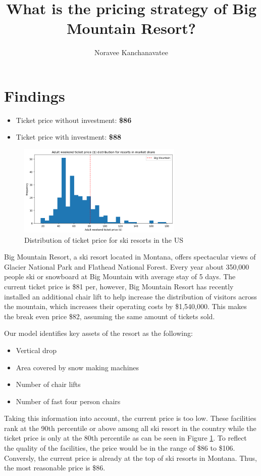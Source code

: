 \documentclass[14pt,a4paper]{extarticle}
\title{What is the pricing strategy of Big Mountain Resort?}
\author{Noravee Kanchanavatee}
\begin{document}
	\maketitle
	\section*{Findings}
	\begin{itemize}
		\item Ticket price without investment: \textbf{\$86}
		\item Ticket price with investment: \textbf{\$88}
	\end{itemize}
	\begin{figure}
		\centering
		\includegraphics[width=0.7\textwidth]{Price}
		\caption{Distribution of ticket price for ski resorts in the US}
		\label{fig1}
	\end{figure}
	Big Mountain Resort, a ski resort located in Montana, offers spectacular views of Glacier National Park and Flathead National Forest. Every year about 350,000 people ski or snowboard at Big Mountain with average stay of 5 days. The current ticket price is \$81 per, however, Big Mountain Resort has recently installed an additional chair lift to help increase the distribution of visitors across the mountain, which increases their operating costs by \$1,540,000. This makes the break even price \$82, assuming the same amount of tickets sold.
	
	Our model identifies key assets of the resort as the following:
	\begin{itemize}
		\item Vertical drop
		\item Area covered by snow making machines
		\item Number of chair lifts
		\item Number of fast four person chairs
	\end{itemize}
	Taking this information into account, the current price is too low. These facilities rank at the 90th percentile or above among all ski resort in the country while the ticket price is only at the 80th percentile as can be seen in Figure \ref{fig1}. To reflect the quality of the facilities, the price would be in the range of \$86 to \$106. Conversly, the current price is already at the top of ski resorts in Montana. Thus, the most reasonable price is \$86.  
	
\end{document}
